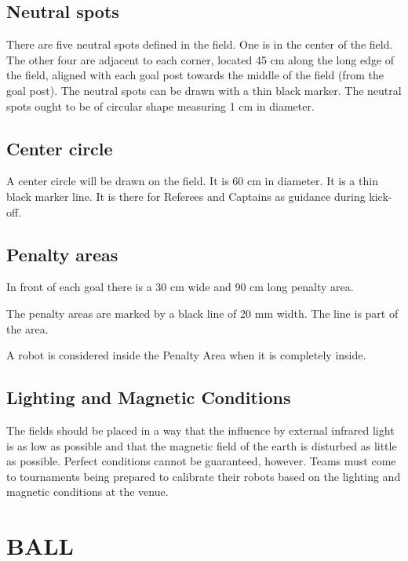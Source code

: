 \documentclass{article}
\begin{document}
\subsection{ Neutral spots \label{ref-034}}

There are five neutral spots defined in the field. One is in the center of the
field. The other four are adjacent to each corner, located 45 cm along the long
edge of the field, aligned with each goal post towards the middle of the field
(from the goal post). The neutral spots can be drawn with a thin black marker.
The neutral spots ought to be of circular shape measuring 1 cm in diameter.

\subsection{ Center circle \label{ref-035}}

A center circle will be drawn on the field. It is 60 cm in diameter. It is a
thin black marker line. It is there for Referees and Captains as guidance
during kick-off.

\subsection{ Penalty areas \label{ref-036}}

In front of each goal there is a 30 cm wide and 90 cm long penalty area.

The penalty areas are marked by a black line of 20 mm width. The line is part
of the area.

A robot is considered inside the Penalty Area when it is completely inside.

\subsection{Lighting and Magnetic Conditions \label{ref-lighting-conditions}}

The fields should be placed in a way that the influence by external infrared
light is as low as possible and that the magnetic field of the earth is
disturbed as little as possible. Perfect conditions cannot be guaranteed,
however. Teams must come to tournaments being prepared to calibrate their
robots based on the lighting and magnetic conditions at the venue.

\section{BALL \label{section:ball}}
\end{document}
